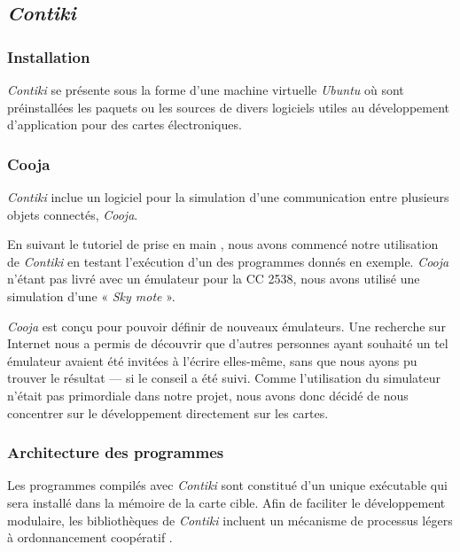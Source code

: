 \subsection{\emph{Contiki}}

\subsubsection{Installation}

\emph{Contiki} se présente sous la forme d’une machine virtuelle \emph{Ubuntu} où sont préinstallées les paquets ou les sources de divers logiciels utiles au développement d’application pour des cartes électroniques.


\subsubsection{Cooja}

\emph{Contiki} inclue un logiciel pour la simulation d’une communication entre plusieurs objets connectés, \emph{Cooja}.

En suivant le tutoriel de prise en main , nous avons commencé notre utilisation de \emph{Contiki} en testant l’exécution d’un des programmes donnés en exemple.
\emph{Cooja} n’étant pas livré avec un émulateur pour la CC 2538, nous avons utilisé une simulation d’une « \textit{Sky mote} ».


\emph{Cooja} est conçu pour pouvoir définir de nouveaux émulateurs.
Une recherche sur Internet nous a permis de découvrir que d’autres personnes ayant souhaité un tel émulateur avaient été invitées à l’écrire elles-même, sans que nous ayons pu trouver le résultat — si le conseil a été suivi.
Comme l’utilisation du simulateur n’était pas primordiale dans notre projet, nous avons donc décidé de nous concentrer sur le développement directement sur les cartes.

\subsubsection{Architecture des programmes}

Les programmes compilés avec \emph{Contiki} sont constitué d’un unique exécutable qui sera installé dans la mémoire de la carte cible.
Afin de faciliter le développement modulaire, les bibliothèques de \emph{Contiki} incluent un mécanisme de processus légers à ordonnancement coopératif .

